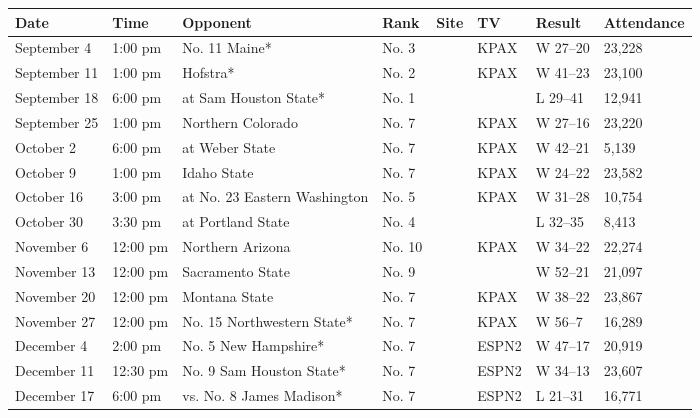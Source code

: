 \documentclass{article}
\begin{document}
\begin{tabular}{llllllll}
\toprule
Date & Time & Opponent & Rank & Site & TV & Result & Attendance \\
\midrule
September 4 & 1:00 pm & No. 11 Maine* & No. 3 &  & KPAX & W 27–20 & 23,228 \\
September 11 & 1:00 pm & Hofstra* & No. 2 &  & KPAX & W 41–23 & 23,100 \\
September 18 & 6:00 pm & at Sam Houston State* & No. 1 &  &  & L 29–41 & 12,941 \\
September 25 & 1:00 pm & Northern Colorado & No. 7 &  & KPAX & W 27–16 & 23,220 \\
October 2 & 6:00 pm & at Weber State & No. 7 &  & KPAX & W 42–21 & 5,139 \\
October 9 & 1:00 pm & Idaho State & No. 7 &  & KPAX & W 24–22 & 23,582 \\
October 16 & 3:00 pm & at No. 23 Eastern Washington & No. 5 &  & KPAX & W 31–28 & 10,754 \\
October 30 & 3:30 pm & at Portland State & No. 4 &  &  & L 32–35 & 8,413 \\
November 6 & 12:00 pm & Northern Arizona & No. 10 &  & KPAX & W 34–22 & 22,274 \\
November 13 & 12:00 pm & Sacramento State & No. 9 &  &  & W 52–21 & 21,097 \\
November 20 & 12:00 pm & Montana State & No. 7 &  & KPAX & W 38–22 & 23,867 \\
November 27 & 12:00 pm & No. 15 Northwestern State* & No. 7 &  & KPAX & W 56–7 & 16,289 \\
December 4 & 2:00 pm & No. 5 New Hampshire* & No. 7 &  & ESPN2 & W 47–17 & 20,919 \\
December 11 & 12:30 pm & No. 9 Sam Houston State* & No. 7 &  & ESPN2 & W 34–13 & 23,607 \\
December 17 & 6:00 pm & vs. No. 8 James Madison* & No. 7 &  & ESPN2 & L 21–31 & 16,771 \\
\bottomrule
\end{tabular}
\end{document}
